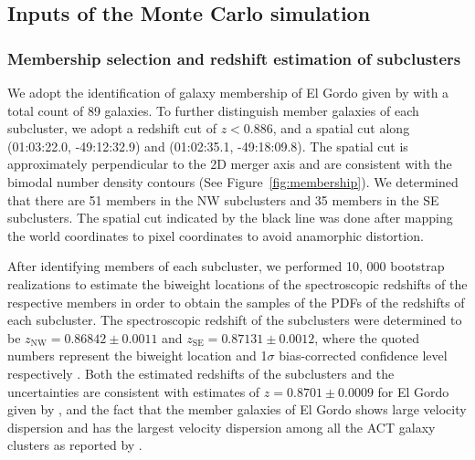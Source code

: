 \subsection{Inputs of the Monte Carlo simulation} \label{sec: inputs}
\setcounter{table}{0} 



\subsubsection{Membership selection and redshift estimation of subclusters}
%
We adopt the identification of galaxy membership of El Gordo given by
 with a total count of 89 galaxies.
To further distinguish member galaxies of each subcluster, we adopt a
redshift cut of $z < 0.886$, and a spatial cut along (01:03:22.0,
-49:12:32.9) and (01:02:35.1, -49:18:09.8). The spatial cut is approximately perpendicular
to the 2D merger axis and are consistent with the bimodal number density
contours (See Figure~\ref{fig:membership}). We determined that
there are 51 members in the NW subclusters and 35 members in the SE
subclusters. 
The spatial cut indicated by the black line was done after
mapping the world coordinates to pixel coordinates to avoid anamorphic
distortion.  

After identifying members of each subcluster, we performed 10, 000 bootstrap realizations to estimate the biweight
locations of the spectroscopic redshifts of the respective members in order
to obtain the
samples of the PDFs of the redshifts of each subcluster. 
The spectroscopic redshift of the subclusters were
determined to be 
$z_{\mathrm{NW}} = 0.86842 \pm 0.0011$ and 
$z_{\mathrm{SE}} = 0.87131 \pm 0.0012$, where the quoted numbers represent the
biweight location and 1$\sigma$ bias-corrected confidence level
respectively \citep{Beers90}.  
Both the estimated redshifts of the subclusters and the uncertainties are
consistent with estimates of $z=0.8701 \pm 0.0009$ for El Gordo given by \citealt{Sifon13}, and the fact that the
member galaxies of El
Gordo shows large velocity dispersion and has the largest velocity
dispersion among all the ACT galaxy clusters as reported by
.

